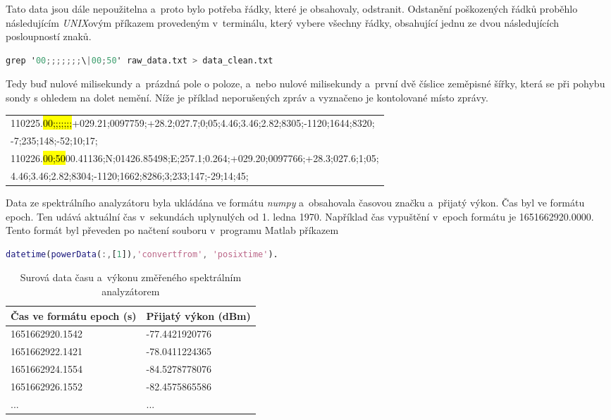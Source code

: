 \documentclass[twoside]{ctuthesis}
\theoremstyle{plain}
\theoremstyle{definition}
\theoremstyle{note}
\begin{document}
	Tato data jsou dále nepoužitelna a~proto bylo potřeba řádky, které je obsahovaly, odstranit. Odstanění poškozených řádků proběhlo následujícím \textit{UNIX}ovým příkazem provedeným v~terminálu, který vybere všechny řádky, obsahující jednu ze dvou následujících posloupností znaků.
	\begin{lstlisting}[language=Awk]
	grep '00;;;;;;;\|00;50' raw_data.txt > data_clean.txt\end{lstlisting}
	Tedy buď nulové milisekundy a~prázdná pole o poloze, a~nebo nulové milisekundy a~první dvě číslice zeměpisné šířky, která se při pohybu sondy s ohledem na dolet nemění. Níže je příklad neporušených zpráv a vyznačeno je kontolované místo zprávy.
	\begin{table}[h!]
		\centering
		\begin{tabular}{l}
			110225.\hl{00;;;;;;;}+029.21;0097759;+28.2;027.7;0;05;4.46;3.46;2.82;8305;-1120;1644;8320;\\
			-7;235;148;-52;10;17;\\\hline
			110226.\hl{00;50}00.41136;N;01426.85498;E;257.1;0.264;+029.20;0097766;+28.3;027.6;1;05;\\
			4.46;3.46;2.82;8304;-1120;1662;8286;3;233;147;-29;14;45;
		\end{tabular}
	\end{table}
	Data ze spektrálního analyzátoru byla ukládána ve formátu \textit{numpy} a~obsahovala časovou značku a~přijatý výkon. Čas byl ve formátu epoch. Ten udává aktuální čas v~sekundách uplynulých od 1. ledna 1970. Například čas vypuštění v~epoch formátu je 1651662920.0000. Tento formát byl převeden po načtení souboru v~programu Matlab příkazem
	\begin{lstlisting}[language=Matlab]
		datetime(powerData(:,[1]),'convertfrom', 'posixtime').\end{lstlisting}
	\begin{table}
		\centering
		\begin{tabular}{l|l}
			Čas ve formátu epoch (s)&	Přijatý výkon (dBm)\\\hline
			1651662920.1542		&      	-77.4421920776\\
			1651662922.1421 	&     	-78.0411224365\\
			1651662924.1554  	&     	-84.5278778076\\
			1651662926.1552	 	&		-82.4575865586\\
			...&...
		\end{tabular}
		\caption{Surová data času a~výkonu změřeného spektrálním analyzátorem}
	\end{table}
	\vfill
\end{document}
